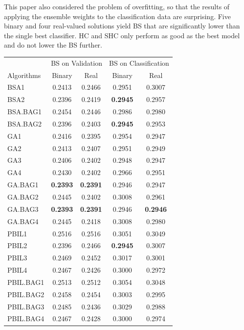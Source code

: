 This paper also considered the problem of overfitting, so that the results of applying the ensemble weights to the classification data are surprising. Five binary and four real-valued solutions yield BS that are significantly lower than the single best classifier. HC and SHC only perform as good as the best model and do not lower the BS further.  

\begin{table}[ht]
	\centering
	\begin{tabular}{lcccc}
		\hline
		& \multicolumn{2}{c}{BS on Validation} & \multicolumn{2}{c}{BS on Classification} \\
		\cline{2-5}
		Algorithms & Binary & Real & Binary & Real \\ 
		\hline
		BSA1 & 0.2413 & 0.2466 & 0.2951 & 0.3007 \\ 
		BSA2 & 0.2396 & 0.2419 & \textbf{0.2945} & 0.2957 \\ 
		BSA.BAG1 & 0.2454 & 0.2446 & 0.2986 & 0.2980 \\ 
		BSA.BAG2 & 0.2396 & 0.2403 & \textbf{0.2945} & 0.2953 \\ 
		GA1 & 0.2416 & 0.2395 & 0.2954 & 0.2947 \\ 
		GA2 & 0.2413 & 0.2407 & 0.2951 & 0.2949 \\ 
		GA3 & 0.2406 & 0.2402 & 0.2948 & 0.2947 \\ 
		GA4 & 0.2430 & 0.2402 & 0.2966 & 0.2951 \\ 
		GA.BAG1 & \textbf{0.2393} & \textbf{0.2391} & 0.2946 & 0.2947 \\ 
		GA.BAG2 & 0.2445 & 0.2402 & 0.3008 & 0.2961 \\ 
		GA.BAG3 & \textbf{0.2393} & \textbf{0.2391} & 0.2946 & \textbf{0.2946} \\ 
		GA.BAG4 & 0.2445 & 0.2418 & 0.3008 & 0.2980 \\ 
		PBIL1 & 0.2516 & 0.2516 & 0.3051 & 0.3049 \\ 
		PBIL2 & 0.2396 & 0.2466 & \textbf{0.2945} & 0.3007 \\ 
		PBIL3 & 0.2469 & 0.2452 & 0.3017 & 0.3001 \\ 
		PBIL4 & 0.2467 & 0.2426 & 0.3000 & 0.2972 \\ 
		PBIL.BAG1 & 0.2513 & 0.2512 & 0.3054 & 0.3048 \\ 
		PBIL.BAG2 & 0.2458 & 0.2454 & 0.3003 & 0.2995 \\ 
		PBIL.BAG3 & 0.2485 & 0.2436 & 0.3029 & 0.2988 \\ 
		PBIL.BAG4 & 0.2467 & 0.2428 & 0.3000 & 0.2974 \\ 

\end{tabular}
\end{table}

